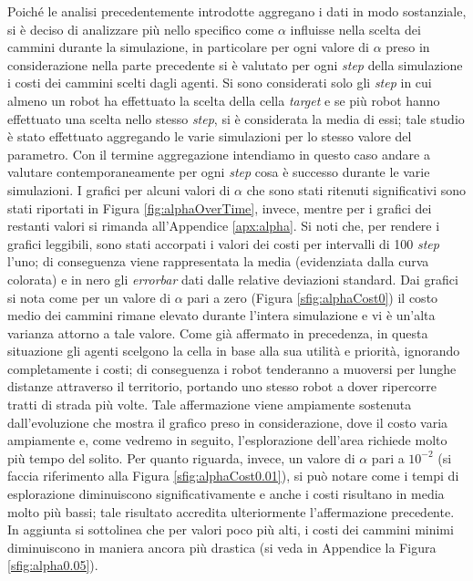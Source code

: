 Poiché le analisi precedentemente introdotte aggregano i dati in modo sostanziale, si è deciso di analizzare più nello specifico come $\alpha$ influisse nella scelta dei cammini durante la simulazione, in particolare per ogni valore di $\alpha$ preso in considerazione nella parte precedente si è valutato per ogni \textit{step} della simulazione i costi dei cammini scelti dagli agenti.
Si sono considerati solo gli \textit{step} in cui almeno un robot ha effettuato la scelta della cella \textit{target} e se più robot hanno effettuato una scelta nello stesso \textit{step}, si è considerata la media di essi; tale studio è stato effettuato aggregando le varie simulazioni per lo stesso valore del parametro. 
Con il termine aggregazione intendiamo in questo caso andare a valutare contemporaneamente per ogni \textit{step} cosa è successo durante le varie simulazioni.
I grafici per alcuni valori di $\alpha$ che sono stati ritenuti significativi sono stati riportati in Figura \ref{fig:alphaOverTime}, invece, mentre per i grafici dei restanti valori si rimanda all'Appendice \ref{apx:alpha}. Si noti che, per rendere i grafici leggibili, sono stati accorpati i valori dei costi per intervalli di 100 \textit{step} l'uno; di conseguenza viene rappresentata la media (evidenziata dalla curva colorata) e in nero gli \textit{errorbar} dati dalle relative deviazioni standard.
Dai grafici si nota come per un valore di $\alpha$ pari a zero (Figura \ref{sfig:alphaCost0}) il costo medio dei cammini rimane elevato durante l'intera simulazione e vi è un'alta varianza attorno a tale valore. Come già affermato in precedenza, in questa situazione gli agenti scelgono la cella in base alla sua utilità e priorità, ignorando completamente i costi; di conseguenza i robot tenderanno a muoversi per lunghe distanze attraverso il territorio, portando uno stesso robot a dover ripercorre tratti di strada più volte.
Tale affermazione viene ampiamente sostenuta dall'evoluzione che mostra il grafico preso in considerazione, dove il costo varia ampiamente e, come vedremo in seguito, l'esplorazione dell'area richiede molto più tempo del solito.
Per quanto riguarda, invece, un valore di $\alpha$ pari a $10^{-2}$ (si faccia riferimento alla Figura \ref{sfig:alphaCost0.01}), si può notare come i tempi di esplorazione diminuiscono significativamente e anche i costi risultano in media molto più bassi; tale risultato accredita ulteriormente l'affermazione precedente.
In aggiunta si sottolinea che per valori poco più alti, i costi dei cammini minimi diminuiscono in maniera ancora più drastica (si veda in Appendice la Figura \ref{sfig:alpha0.05}).
